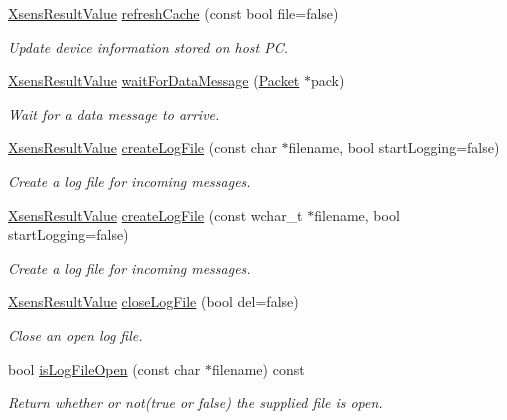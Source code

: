 \begin{DoxyCompactItemize}
\hyperlink{group__enums_ga822a2260a20af524029eef9e9a51ff6f}{\-Xsens\-Result\-Value} \hyperlink{classxsens_1_1Cmt3_aabb1723071ba372c7c6d14f4cd63eb1d}{refresh\-Cache} (const bool file=false)
\begin{DoxyCompactList}\small\item\em \-Update device information stored on host \-P\-C. \end{DoxyCompactList}\item 
\hyperlink{group__enums_ga822a2260a20af524029eef9e9a51ff6f}{\-Xsens\-Result\-Value} \hyperlink{classxsens_1_1Cmt3_a26bc6d2d2236564df364299a13698294}{wait\-For\-Data\-Message} (\hyperlink{classxsens_1_1Packet}{\-Packet} $\ast$pack)
\begin{DoxyCompactList}\small\item\em \-Wait for a data message to arrive. \end{DoxyCompactList}\item 
\hyperlink{group__enums_ga822a2260a20af524029eef9e9a51ff6f}{\-Xsens\-Result\-Value} \hyperlink{classxsens_1_1Cmt3_a8c539705b75ecde21bfa9f53fb861075}{create\-Log\-File} (const char $\ast$filename, bool start\-Logging=false)
\begin{DoxyCompactList}\small\item\em \-Create a log file for incoming messages. \end{DoxyCompactList}\item 
\hyperlink{group__enums_ga822a2260a20af524029eef9e9a51ff6f}{\-Xsens\-Result\-Value} \hyperlink{classxsens_1_1Cmt3_a5d1a972bd423e858175d7b0de1f92b54}{create\-Log\-File} (const wchar\-\_\-t $\ast$filename, bool start\-Logging=false)
\begin{DoxyCompactList}\small\item\em \-Create a log file for incoming messages. \end{DoxyCompactList}\item 
\hyperlink{group__enums_ga822a2260a20af524029eef9e9a51ff6f}{\-Xsens\-Result\-Value} \hyperlink{classxsens_1_1Cmt3_a740c001f68c9fb45ac9ff4bd0cbb3b87}{close\-Log\-File} (bool del=false)
\begin{DoxyCompactList}\small\item\em \-Close an open log file. \end{DoxyCompactList}\item 
bool \hyperlink{classxsens_1_1Cmt3_afda8e4739e44e7d4e3e3a1dc23f2f9c7}{is\-Log\-File\-Open} (const char $\ast$filename) const 
\begin{DoxyCompactList}\small\item\em \-Return whether or not(true or false) the supplied file is open. \end{DoxyCompactList}\item 

\end{DoxyCompactItemize}
